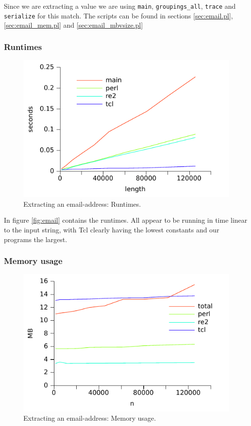Since we are extracting a value we are using \texttt{main},
\texttt{groupings\_all}, \texttt{trace} and \texttt{serialize} for
this match. The scripts can be found in sections \vref{sec:email.pl},
\vref{sec:email_mem.pl} and \vref{sec:email_mbvsize.pl}

\subsubsection{Runtimes}

\begin{figure}
\centering
\includegraphics{benchmarks/email.pdf}
\caption{Extracting an email-address: Runtimes.}
\label{fig:email}
\end{figure}

In figure \vref{fig:email} contains the runtimes. All appear to be
running in time linear to the input string, with Tcl clearly having
the lowest constants and our programs the largest. 


\subsubsection{Memory usage}
\begin{figure}
\centering
\includegraphics{benchmarks/memory/email_mem.pdf}
\caption{Extracting an email-address: Memory usage.}
\label{fig:email_mem}
\end{figure}

